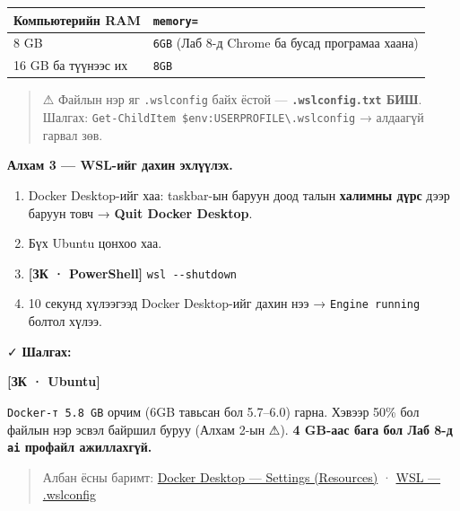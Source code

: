 \begingroup\scriptsize\begin{longtable}[]{@{}ll@{}}
\toprule
Компьютерийн RAM & \texttt{memory=}\tabularnewline
\midrule
\endhead
8 GB & \texttt{6GB} (Лаб 8-д Chrome ба бусад програмаа хаана)\tabularnewline
16 GB ба түүнээс их & \texttt{8GB}\tabularnewline
\bottomrule
\end{longtable}\endgroup

\begin{quote}
⚠ Файлын нэр яг \texttt{.wslconfig} байх ёстой --- \textbf{\texttt{.wslconfig.txt} БИШ}. Шалгах: \texttt{Get-ChildItem\ \$env:\allowbreak{}USERPROFILE\textbackslash{}\allowbreak{}.\allowbreak{}wslconfig} → алдаагүй гарвал зөв.
\end{quote}

\textbf{Алхам 3 --- WSL-ийг дахин эхлүүлэх.}

\begin{enumerate}
\def\labelenumi{\arabic{enumi}.}
\tightlist
\item
  Docker Desktop-ийг хаа: taskbar-ын баруун доод талын \textbf{халимны дүрс} дээр баруун товч → \textbf{Quit Docker Desktop}.
\item
  Бүх Ubuntu цонхоо хаа.
\item
  \textbf{{[}ЗК · PowerShell{]}} \texttt{wsl\ -\/\allowbreak{}-shutdown}
\item
  10 секунд хүлээгээд Docker Desktop-ийг дахин нээ → \texttt{Engine\ running} болтол хүлээ.
\end{enumerate}

✓ \textbf{Шалгах:}

\textbf{{[}ЗК · Ubuntu{]}}

\begin{Shaded}
\begin{Highlighting}[]
 \KeywordTok{|}  
\end{Highlighting}
\end{Shaded}

\texttt{Docker-т\ 5.\allowbreak{}8\ GB} орчим (6GB тавьсан бол 5.7--6.0) гарна. Хэвээр 50\% бол файлын нэр эсвэл байршил буруу (Алхам 2-ын ⚠). \textbf{4 GB-аас бага бол Лаб 8-д \texttt{ai} профайл ажиллахгүй.}

\begin{quote}
Албан ёсны баримт: \href{https://docs.docker.com/desktop/settings-and-maintenance/settings/}{Docker Desktop --- Settings (Resources)} · \href{https://learn.microsoft.com/en-us/windows/wsl/wsl-config}{WSL --- .wslconfig}
\end{quote}

